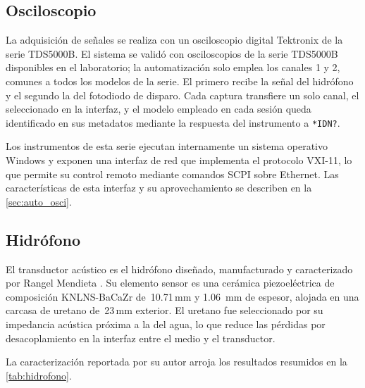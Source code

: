 \subsection*{Osciloscopio}

La adquisición de señales se realiza con un osciloscopio digital
Tektronix de la serie TDS5000B. El sistema se validó con
osciloscopios de la serie TDS5000B disponibles en el laboratorio; la
automatización solo emplea los canales 1 y 2, comunes a todos los
modelos de la serie. El primero recibe la señal del hidrófono y el
segundo la del fotodiodo de disparo. Cada captura transfiere un solo
canal, el seleccionado en la interfaz, y el modelo empleado en cada
sesión queda identificado en sus metadatos mediante la respuesta del
instrumento a \texttt{*IDN?}.

Los instrumentos de esta serie ejecutan internamente un sistema
operativo Windows y exponen una interfaz de red que implementa el
protocolo VXI-11, lo que permite su control remoto mediante comandos
SCPI sobre Ethernet. Las características de esta interfaz y su
aprovechamiento se describen en la \cref{sec:auto_osci}.

\subsection*{Hidrófono}

El transductor acústico es el hidrófono diseñado, manufacturado y
caracterizado por Rangel Mendieta \cite{Rangel2023}. Su elemento
sensor es una cerámica piezoeléctrica de composición KNLNS-BaCaZr de
\diameter\,10.71\,\si{\milli\meter} y \SI{1.06}{\milli\meter} de
espesor, alojada en una carcasa de uretano de
\diameter\,23\,\si{\milli\meter} exterior. El uretano fue
seleccionado por su impedancia acústica próxima a la del agua, lo que
reduce las pérdidas por desacoplamiento en la interfaz entre el medio
y el transductor.

La caracterización reportada por su autor arroja los resultados
resumidos en la \cref{tab:hidrofono}.

